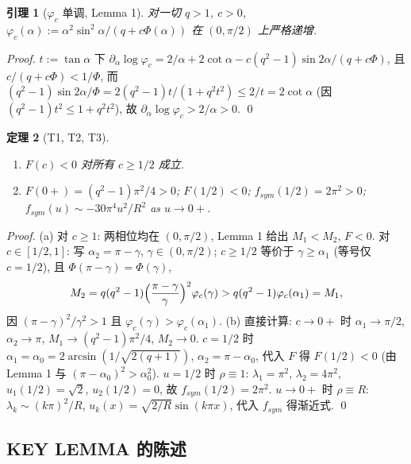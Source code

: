 \documentclass[UTF8]{ctexart}
\newtheorem{theorem}{定理}[section]
\newtheorem{lemma}[theorem]{引理}
\begin{document}
\begin{lemma}[$\varphi_c$ 单调, Lemma 1]
对一切 $q>1$, $c>0$,
$\varphi_c(\alpha):=\alpha^2\sin^2\alpha/(q+c\Phi(\alpha))$ 在 $(0,\pi/2)$ 上严格递增.
\end{lemma}
\begin{proof}
$t:=\tan\alpha$ 下
$\partial_\alpha\log\varphi_c=2/\alpha+2\cot\alpha-c(q^2-1)\sin2\alpha/(q+c\Phi)$,
且 $c/(q+c\Phi)<1/\Phi$, 而
$(q^2-1)\sin2\alpha/\Phi=2(q^2-1)t/(1+q^2t^2)\le 2/t=2\cot\alpha$
(因 $(q^2-1)t^2\le1+q^2t^2$), 故 $\partial_\alpha\log\varphi_c>2/\alpha>0$. \qed
\end{proof}

\begin{theorem}[T1, T2, T3]
\label{thm:T123}
\begin{enumerate}[label=(\alph*)]
	\item $F(c)<0$ 对所有 $c\ge1/2$ 成立.
	\item $F(0+)=(q^2-1)\pi^2/4>0$; $F(1/2)<0$; $f_{sym}(1/2)=2\pi^2>0$;
	$f_{sym}(u)\sim-30\pi^4u^2/R^2$ as $u\to0+$.
\end{enumerate}
\end{theorem}
\begin{proof}
(a) 对 $c\ge1$: 两相位均在 $(0,\pi/2)$, Lemma 1 给出 $M_1<M_2$, $F<0$.
对 $c\in[1/2,1]$: 写 $\alpha_2=\pi-\gamma$, $\gamma\in(0,\pi/2)$; $c\ge1/2$ 等价于
$\gamma\ge\alpha_1$ (等号仅 $c=1/2$), 且 $\Phi(\pi-\gamma)=\Phi(\gamma)$,
\begin{equation}
	M_2=q(q^2-1)\Bigl(\frac{\pi-\gamma}{\gamma}\Bigr)^2\varphi_c(\gamma)
	>q(q^2-1)\varphi_c(\alpha_1)=M_1,
\end{equation}
因 $(\pi-\gamma)^2/\gamma^2>1$ 且 $\varphi_c(\gamma)>\varphi_c(\alpha_1)$.
(b) 直接计算: $c\to0+$ 时 $\alpha_1\to\pi/2$, $\alpha_2\to\pi$, $M_1\to(q^2-1)\pi^2/4$,
$M_2\to0$. $c=1/2$ 时 $\alpha_1=\alpha_0=2\arcsin(1/\sqrt{2(q+1)})$,
$\alpha_2=\pi-\alpha_0$, 代入 $F$ 得 $F(1/2)<0$ (由 Lemma 1 与 $(\pi-\alpha_0)^2>\alpha_0^2$).
$u=1/2$ 时 $\rho\equiv1$: $\lambda_1=\pi^2$, $\lambda_2=4\pi^2$, $u_1(1/2)=\sqrt2$,
$u_2(1/2)=0$, 故 $f_{sym}(1/2)=2\pi^2$. $u\to0+$ 时 $\rho\equiv R$:
$\lambda_k\sim(k\pi)^2/R$, $u_k(x)=\sqrt{2/R}\sin(k\pi x)$, 代入 $f_{sym}$ 得渐近式. \qed
\end{proof}

\subsection{KEY LEMMA 的陈述}
\end{document}
